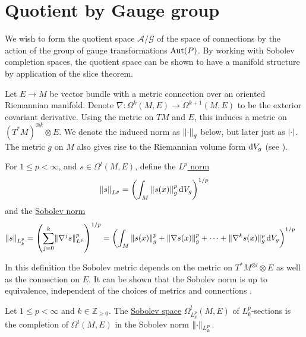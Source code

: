 \section{Quotient by Gauge group}
We wish to form the quotient space $\mathcal{A} /\mathcal{G}$ 
of the space of connections by the action of
the group of gauge transformations $\operatorname{Aut}(P)$. By working with Sobolev completion
spaces, the quotient space can be shown to have a manifold structure by 
application of the slice theorem.

Let $E\to M$ be vector bundle with a metric connection over an oriented 
Riemannian manifold. 
Denote $\nabla : \Omega^k(M,E) \to \Omega^{k+1}(M,E)$ to be the exterior
covariant derivative. Using the metric on $TM$ and  $E$, this induces a
metric on  $(T^*M)^{\otimes k}\otimes E$. We denote the induced norm as 
$\norm{\cdot}_g$ below, but later just as $\abs{\cdot}$.
The metric $g$ on $M$ also gives rise to the Riemannian volume form $\odif{V}_g$
(see \cite[Prop 2.41]{riemannian_manifolds}).
\begin{defn}
    For $1 \leq p < \infty$, and $s \in \Omega^l(M,E)$, 
	define the \underline{$L^p$ norm}
	\[
		 \norm{s}_{L^p} = \paren{\int_M \norm{s(x)}^p_g \odif{V}_g}^{1 /p}
	\] 
	and the \underline{Sobolev norm}
	\begin{align*}
		\norm{s}_{L^p_k} 
		&= \paren{\sum_{j=0}^{k} \norm[*]{\nabla^j s}_{L^p}^p }^{1 /p} 
		= \paren{ \int_M \norm{s(x)}^p_g + \norm{\nabla s(x)}^p_g + \cdots
		+ \norm[*]{\nabla^k s(x)}^p_g \odif{V}_g}^{1 /p} 
	\end{align*}
\end{defn}
In this definition the Sobolev metric depends on the metric on $T^*M^{\otimes
l}\otimes E$ as well as the connection on $E$. It can be shown that the Sobolev
norm is up to equivalence, independent of the choices of metrics and connections
\cite[Lemma 11.22]{math_for_physics}.
\begin{defn}
	Let $1\leq p < \infty$ and  $k\in \mathbb{Z}_{\geq 0}$. The
	\underline{Sobolev
	space} $\Omega^l_{L^p_k}(M,E)$ of $L^p_k$-sections is the completion of
	$\Omega^l(M,E)$ in the Sobolev norm  $\norm{\cdot}_{L^p_k}$.
\end{defn}

